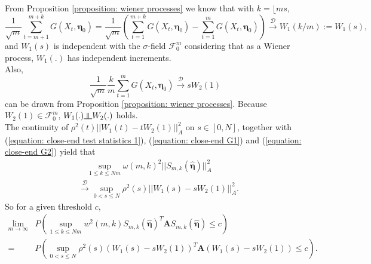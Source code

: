 \documentclass{article}
\newcommand{\indep}{\rotatebox[origin=c]{90}{$\models$}}
\theoremstyle{definition}
\begin{document}
From Proposition \ref{proposition: wiener processes} we know that with $k = \lfloor ms$,
\begin{equation}
\label{equation: close-end G1}
    \frac{1}{\sqrt{m}}\sum_{t=m+1}^{m+k}G(X_t,\bm{\eta}_0) = \frac{1}{\sqrt{m}}(\sum_{t=1}^{m+k}G(X_t,\bm{\eta}_0)-\sum_{t=1}^m G(X_t,\bm{\eta}_0)) \overset{\mathcal{D}}{\rightarrow} W_1(k/m):=W_1(s),
\end{equation}
and $W_1(s)$ is independent with the $\sigma$-field $\mathcal{F}_0^m$ considering that as a Wiener process, $W_1(.)$ has independent increments. \\
Also, 
\begin{equation}
\label{equation: close-end G2} 
    \frac{1}{\sqrt{m}}\frac{k}{m} \sum_{t=1}^m G(X_t,\bm{\eta}_0) \overset{\mathcal{D}}{\rightarrow} sW_2(1)
\end{equation}
can be drawn from Proposition \ref{proposition: wiener processes}. Because $W_2(1) \in \mathcal{F}_0^m$, $W_1(.) \indep W_2(.)$ holds. \\
The continuity of $\rho^2(t)||W_1(t)-tW_2(1)||^2_A$ on $s \in [0,N]$, together with (\ref{equation: close-end test statistics 1}), (\ref{equation: close-end G1}) and (\ref{equation: close-end G2}) yield that
\begin{equation*}
\begin{aligned}
        \label{equation: close-end test statistics 2}
    &\quad\underset{1\leq k \leq Nm}{\sup}\omega(m,k)^2 ||S_{m,k}(\hat{\bm{\eta}})||^2_A \\
    &\overset{\mathcal{D}}{\rightarrow} \underset{0<s\leq N}{\sup} \rho^2(s)||W_1(s)-sW_2(1)||^2_A.
\end{aligned}
\end{equation*}
So for a given threshold $c$,
\begin{equation*}
\begin{aligned}
    \underset{m \rightarrow \infty}{\lim}& P\left(\underset{1\leq k \leq Nm}{\sup} w^2(m,k)S_{m,k}(\hat{\bm{\eta}})^T\bm{A}S_{m,k}(\hat{\bm{\eta}}) \leq c    \right) \\
     = &P\left( \underset{0<s\leq N}{\sup} \rho^2(s)(W_1(s)-sW_2(1))^T\bm{A}(W_1(s)-sW_2(1))\leq c \right).
\end{aligned}
\end{equation*}
\end{document}
